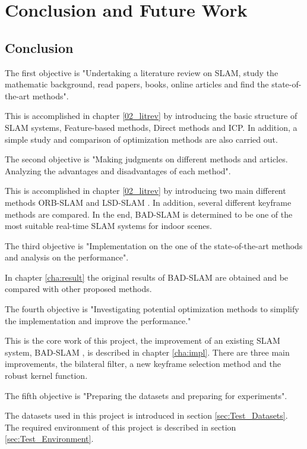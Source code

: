 \chapter{Conclusion and Future Work}
\section{Conclusion}
\label{sec:conclusion}

The first objective is "Undertaking a literature review on \ac{SLAM}, study the mathematic background, read papers, books, online articles and find the state-of-the-art methods".

This is accomplished in chapter \ref{02_litrev} by introducing the basic structure of SLAM systems, Feature-based methods, Direct methods and \ac{ICP}. In addition, a simple study and comparison of optimization methods are also carried out. 

The second objective is "Making judgments on different methods and articles. Analyzing the advantages and disadvantages of each method".

This is accomplished in chapter \ref{02_litrev} by introducing two main different methods ORB-SLAM \parencite{7219438} and LSD-SLAM \parencite{7353366}. In addition, several different keyframe methods are compared. In the end, BAD-SLAM \parencite{8954208} is determined to be one of the most suitable real-time SLAM systems for indoor scenes.

The third objective is "Implementation on the one of the state-of-the-art methods and analysis on the performance".

In chapter \ref{cha:result} the original results of BAD-SLAM are obtained and be compared with other proposed methods. 

The fourth objective is "Investigating potential optimization methods to simplify the implementation and improve the performance."

This is the core work of this project, the improvement of an existing SLAM system, BAD-SLAM \parencite{8954208}, is described in chapter \ref{cha:impl}. There are three main improvements, the bilateral filter, a new keyframe selection method and the robust kernel function.

The fifth objective is "Preparing the datasets and preparing for experiments".

The datasets used in this project is introduced in section \ref{sec:Test_Datasets}. The required environment of this project is described in section \ref{sec:Test_Environment}.

